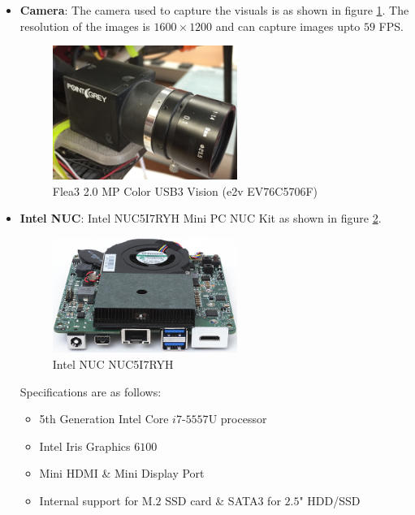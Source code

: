 \documentclass[12pt]{report}
\begin{document}
\begin{itemize}
\item \textbf{Camera}: The camera used to capture the visuals is \cite{flea_camera} as shown in figure \ref{fig:cam}. The resolution of the images is $1600 \times 1200$ and can capture images upto $59$ FPS.
\begin{figure}[H]
	\centering 
    \includegraphics[width=6cm]{cam.jpg}
	\caption{Flea3 2.0 MP Color USB3 Vision (e2v EV76C5706F)}
   \label{fig:cam}
\end{figure}

\item \textbf{Intel NUC}: Intel NUC5I7RYH Mini PC NUC Kit as shown in figure \ref{fig:nuc}. 
\begin{figure}[H]
	\centering 
    \includegraphics[width=6cm]{nuc.jpg}
	\caption{Intel NUC NUC5I7RYH}
   \label{fig:nuc}
\end{figure}
Specifications are as follows:
\begin {itemize}
\item 5th Generation Intel Core $i7$-$5557$U processor
\item Intel Iris Graphics $6100$
\item Mini HDMI \& Mini Display Port
\item Internal support for M.$2$ SSD card \& SATA$3$ for $2.5$" HDD/SSD
\end{itemize}


\end{itemize}
\end{document}
